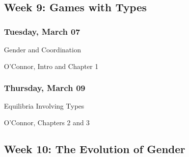\documentclass[
]{article}
\providecommand{\tightlist}{%
  \setlength{\itemsep}{0pt}\setlength{\parskip}{0pt}}
\begin{document}
\hypertarget{week-9-games-with-types}{%
\subsection{Week 9: Games with Types}\label{week-9-games-with-types}}

\begin{multicols}{2}

\hypertarget{tuesday-march-07}{%
\subsubsection{Tuesday, March 07}\label{tuesday-march-07}}

\begin{description}
\tightlist
\item[Topic]
Gender and Coordination
\item[Reading]
O'Connor, Intro and Chapter 1
\end{description}

\hypertarget{thursday-march-09}{%
\subsubsection{Thursday, March 09}\label{thursday-march-09}}

\begin{description}
\tightlist
\item[Topic]
Equilibria Involving Types
\item[Reading]
O'Connor, Chapters 2 and 3
\end{description}

\end{multicols}

\hypertarget{week-10-the-evolution-of-gender}{%
\subsection{Week 10: The Evolution of
Gender}\label{week-10-the-evolution-of-gender}}
\end{document}
